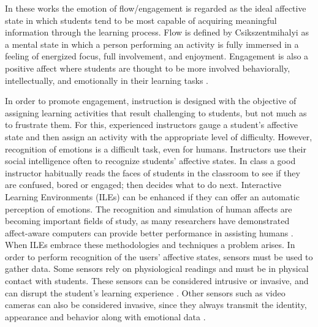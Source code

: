 \documentclass[a4paper,twoside]{article}
\begin{document}
In these works the emotion of flow/engagement is regarded as the ideal affective state in which
students tend to be most capable of acquiring meaningful information through the
learning process. Flow is defined by Csikszentmihalyi \cite{csikszentmihalyi1990flow}
as a mental state in which a person performing an activity is fully immersed in a feeling of
energized focus, full involvement, and enjoyment. Engagement is also a positive
affect where students are thought to be more involved behaviorally,
intellectually, and emotionally in their learning tasks \cite{bangert2002teacher}.

In order to promote engagement, instruction is designed with the
objective of assigning learning activities
that result challenging to students, but not much as to frustrate them. For
this, experienced instructors gauge a student’s affective state and then assign
an activity with the appropriate level of difficulty. However, recognition of 
emotions is a difficult task, even
for humans. Instructors use their social intelligence often to recognize
students’ affective states. In class a good instructor habitually reads the
faces of students in the classroom to see if they are confused, bored or
engaged; then decides what to do next. Interactive Learning Environments (ILEs)
can be enhanced if they can offer an
automatic perception of emotions. The recognition and simulation of human
affects are becoming important fields of study, as many researchers have
demonstrated affect-aware computers can provide better performance in assisting
humans \cite{picard2001toward}. When ILEs embrace these methodologies and techniques a
problem arises. In order to perform recognition of the users' affective states,
sensors must be used to gather data. Some sensors rely on physiological readings
and must be in physical contact with students. These sensors can be considered
intrusive or invasive, and can disrupt the student’s learning experience 
\cite{zhai2008stress,sidney2005integrating,arroyo2009emotion}.
Other sensors such as video cameras can also be considered invasive, since they always transmit the
identity, appearance and behavior along with emotional data \cite{picard2001toward}.
\end{document}
